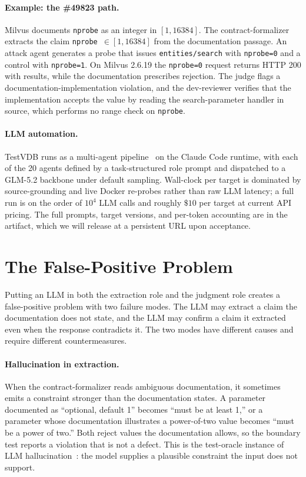 \documentclass[sigconf]{acmart}
\begin{document}
\paragraph{Example: the \#49823 path.}
Milvus documents \texttt{nprobe} as an integer in $[1, 16384]$. The contract-formalizer extracts the claim \texttt{nprobe}~$\in [1, 16384]$ from the documentation passage. An attack agent generates a probe that issues \texttt{entities/search} with \texttt{nprobe=0} and a control with \texttt{nprobe=1}. On Milvus 2.6.19 the \texttt{nprobe=0} request returns HTTP 200 with results, while the documentation prescribes rejection. The judge flags a documentation-implementation violation, and the dev-reviewer verifies that the implementation accepts the value by reading the search-parameter handler in source, which performs no range check on \texttt{nprobe}.

\paragraph{LLM automation.}
TestVDB runs as a multi-agent pipeline~\cite{hou23llmse} on the Claude Code runtime, with each of the 20 agents defined by a task-structured role prompt and dispatched to a GLM-5.2 backbone under default sampling. Wall-clock per target is dominated by source-grounding and live Docker re-probes rather than raw LLM latency; a full run is on the order of $10^4$ LLM calls and roughly $\$10$ per target at current API pricing. The full prompts, target versions, and per-token accounting are in the artifact, which we will release at a persistent URL upon acceptance.
\section{The False-Positive Problem}
\label{sec:fp}

Putting an LLM in both the extraction role and the judgment role creates a false-positive problem with two failure modes. The LLM may extract a claim the documentation does not state, and the LLM may confirm a claim it extracted even when the response contradicts it. The two modes have different causes and require different countermeasures.

\paragraph{Hallucination in extraction.}
When the contract-formalizer reads ambiguous documentation, it sometimes emits a constraint stronger than the documentation states. A parameter documented as ``optional, default 1'' becomes ``must be at least 1,'' or a parameter whose documentation illustrates a power-of-two value becomes ``must be a power of two.'' Both reject values the documentation allows, so the boundary test reports a violation that is not a defect. This is the test-oracle instance of LLM hallucination~\cite{ji23hall}: the model supplies a plausible constraint the input does not support.
\end{document}
